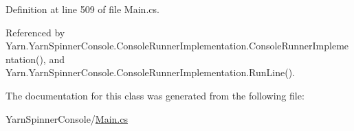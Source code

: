 Definition at line 509 of file Main.\-cs.



Referenced by Yarn.\-Yarn\-Spinner\-Console.\-Console\-Runner\-Implementation.\-Console\-Runner\-Implementation(), and Yarn.\-Yarn\-Spinner\-Console.\-Console\-Runner\-Implementation.\-Run\-Line().



The documentation for this class was generated from the following file\-:\begin{DoxyCompactItemize}
\item 
Yarn\-Spinner\-Console/\hyperlink{a00313}{Main.\-cs}\end{DoxyCompactItemize}
